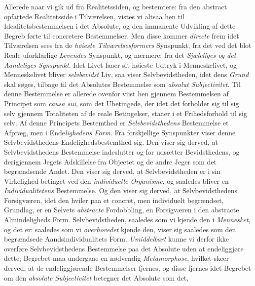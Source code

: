 Allerede naar vi gik ud fra Realitetssiden, og bestemtere: fra den abstract
opfattede Realitetsside i Tilværelsen, vistes vi altsaa hen til
Idealitetsbestemmelsen i det Absolute, og den immanente Udvikling af dette
Begreb førte til concretere Bestemmelser. Men disse kommer \emph{directe} frem
idet Tilværelsen sees fra de \emph{høieste Tilværelsesformers} Synspunkt, fra
det ved det blot Reale uforklarlige \emph{Levendes} Synspunkt, og nærmere: fra
det \emph{Sjæleliges og det Aandeliges Synspunkt}. Idet Livet faaer sit
høieste Udtryk i Menneskelivet, og Menneskelivet bliver \emph{selvbevidst}
Liv, saa viser Selvbevidstheden, idet dens \emph{Grund} skal søges, tilbage
til det Absolutes Bestemmelse som \emph{absolut Subjectivitet}. Til denne
Bestemmelse er allerede ovenfor viist hen gjennem Bestemmelsen af Principet
som \textit{causa sui}, som det Ubetingede, der idet det forholder sig til sig
selv gjennem Totaliteten af de reale Betingelser, staaer i et Frihedsforhold
til sig selv. Af denne Principets Bestemthed er \emph{Selvbevidsthedens}
Bestemmelse et Afpræg, men i Ende\emph{lighedens Form}. Fra forskjellige
Synspunkter viser denne Selvbevidsthedens Endelighedsbestemthed sig. Den viser
sig derved, at Selvbevidsthedens Bestemmelse indeslutter og for\-%
udsætter Bevidsthedens, og derigjennem Jegets Adskillelse fra Objectet og de
andre Jeger som det begrændsende Andet. Den viser sig derved, at
Selvbevidstheden er i sin Virkelighed betinget ved den \emph{individuelle
Organisme}, og saaledes bliver en \emph{Individualitetens} Bestemmelse. Og den
viser sig derved, at Selvbevidsthedens Forsigværen, idet den hviler paa et
concret, men individuelt begrændset, Grundlag, er en Selvets \emph{abstracte}
Fordobbling, en Forsigværen i den abstracte Almindeligheds Form.
Selvbevidstheden, saaledes som vi kjende den i \emph{Mennesket}, og det er:
saaledes som vi \emph{overhovedet} kjende den, viser sig saaledes som den
begrændsede Aandsindividualitets Form. \emph{Umiddelbart} kunne vi derfor ikke
overføre Selvbevidsthedens Bestemmelse paa det Absolute uden at endeliggjøre
dette; Begrebet maa undergaae en nødvendig \emph{Metamorphose}, hvilket skeer
derved, at de endeliggjørende Bestemmelser fjernes, og disse fjernes idet
Begrebet om den \emph{absolute Subjectivitet} betegner det Absolute som det,
